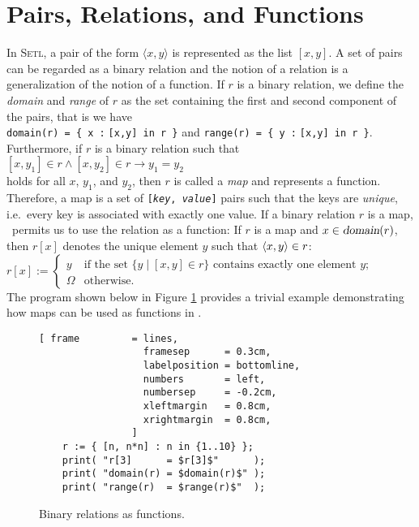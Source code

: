 \section{Pairs, Relations,  and Functions}
In \textsc{Setl}, a pair of the form $\langle x, y \rangle$ is represented as the list $[x,y]$.
A set of pairs can be regarded as a binary relation and the notion of a relation is a
generalization of the notion of a function.   If $r$ is a binary relation, we define the
\emph{domain} and \emph{range} of $r$ as the set containing the first and second component
of the pairs, that is we have
\\[0.2cm]
\hspace*{1.3cm}
\texttt{domain(r) = \{ x :$\;$[x,y] in r \}} \quad and \quad
\texttt{range(r)  = \{ y :$\;$[x,y] in r \}}.
\\[0.2cm]
Furthermore, if $r$ is a binary relation
such that 
\\[0.2cm]
\hspace*{1.3cm}
$[x,y_1] \in r \wedge [x,y_2] \in r \rightarrow y_1 = y_2$ 
\\[0.2cm]
holds for all $x$, $y_1$, and $y_2$, then $r$ is called a \emph{map} and represents a function.
Therefore, a map is a set of \texttt{[\textsl{key}, \textsl{value}]} pairs such that the
keys are \emph{unique}, i.e.~every key is associated with exactly one value.
If a binary relation $r$ is a map, \setlx\ permits us to use the relation as a function:  If $r$ is a map
and $x \in \textsl{domain}(r)$, then $r[x]$ denotes the unique element $y$ such that 
$\pair(x,y) \in r$:
\\[0.2cm]
\hspace*{1.3cm}
$r[x] := \left\{
\begin{array}{ll}
  y & \mbox{if the set $\{ y \mid [x,y] \in r\}$ contains exactly one element $y$;} \\[0.2cm]
  \Omega & \mbox{otherwise}.
\end{array} \right.
$
\\[0.2cm]
The program shown below in Figure
\ref{fig:map.stlx} provides a trivial example demonstrating how maps can be used
as functions in  \setlx.  
 

\begin{figure}[!ht]
  \centering
\begin{Verbatim}[ frame         = lines, 
                  framesep      = 0.3cm, 
                  labelposition = bottomline,
                  numbers       = left,
                  numbersep     = -0.2cm,
                  xleftmargin   = 0.8cm,
                  xrightmargin  = 0.8cm,
                ]
    r := { [n, n*n] : n in {1..10} };
    print( "r[3]      = $r[3]$"      );
    print( "domain(r) = $domain(r)$" );
    print( "range(r)  = $range(r)$"  );
\end{Verbatim} 
\vspace*{-0.3cm}
\caption{Binary relations as functions.}  \label{fig:map.stlx}
\end{figure} %

